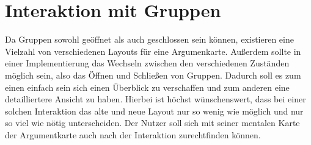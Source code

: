 

\section{Interaktion mit Gruppen}
Da Gruppen sowohl geöffnet als auch geschlossen sein können, existieren eine Vielzahl von verschiedenen Layouts für eine Argumenkarte.
Außerdem sollte in einer Implementierung das Wechseln zwischen den verschiedenen Zuständen möglich sein, also das Öffnen und Schließen von Gruppen. 
Dadurch soll es zum einen einfach sein sich einen Überblick zu verschaffen und zum anderen eine detailliertere Ansicht zu haben.
Hierbei ist höchst wünschenswert, dass bei einer solchen Interaktion das alte und neue Layout nur so wenig wie möglich und nur so viel wie nötig unterscheiden. 
Der Nutzer soll sich mit seiner mentalen Karte der Argumentkarte auch nach der Interaktion zurechtfinden können.


